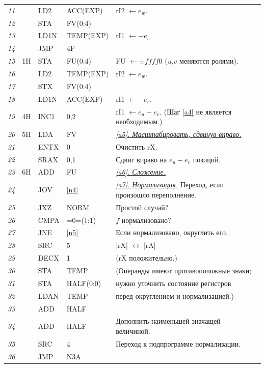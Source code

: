 \begin{longtable}{l l l l l}
\textit{11}	& & LD2 & ACC(EXP) & rI2 $\leftarrow e_w$.\\
\textit{12}	& & STA & FV(0:4) &\\	
\textit{13}	& & LD1N & TEMP(EXP) & rI1 $\leftarrow -e_v$\\
\textit{14}	& & JMP & 4F &\\	
\textit{15} & 1H & STA & FU(0:4) & FU $\leftarrow \pm f f f f 0$ ($u$,$v$ меняются ролями).\\
\textit{16} & & LD2 & TEMP(EXP) & rI2 $\leftarrow e_w$.\\
\textit{17} & & STX & FV(0:4) &\\	
\textit{18}	& & LD1N & ACC(EXP) & rI1 $\leftarrow -e_v$.\\
\textit{19} & 4H & INC1 & 0,2 & rI1 $\leftarrow e_u - e_v$. (Шаг \ref{a4} не является необходимым.)\\
\textit{20} & 5H & LDA & FV & \underline{\textit{\ref{a5}. Масштабировать, сдвинув вправо.}}\\
\textit{21}	& & ENTX & 0 & Очистить rX.\\
\textit{22} & & SRAX & 0,1 & Сдвиг вправо на $e_u - e_v$ позиций.\\
\textit{23} & 6H & ADD & FU & \underline{\textit{\ref{a6}. Сложение.}}\\
\textit{24}	& & JOV & \ref{n4} & \underline{\textit{\ref{a7}. Нормализация.}} Переход, если произошло переполнение.\\
\textit{25}	& & JXZ & NORM & Простой случай?\\
\textit{26}	& & CMPA & =0=(1:1) & $f$ нормализовано?\\
\textit{27}	& & JNE & \ref{n5} & Если нормализовано, округлить его.\\
\textit{28}	& & SRC & 5 & |rX| $\leftrightarrow$ |rA|\\
\textit{29}	& & DECX & 1 & (rX положительно.)\\
\textit{30}	& & STA & TEMP & (Операнды имеют противоположные знаки;\\
\textit{31}	& & STA & HALF(0:0) & нужно уточнить состояние регистров\\
\textit{32}	& & LDAN & TEMP & перед округлением и нормализацией.)\\
\textit{33}	& & ADD & HALF &\\	
\textit{34}	& & ADD & HALF & Дополнить наименьшей значащей величиной.\\
\textit{35} & & SRC & 4 & Переход к подпрограмме нормализации.\\
\textit{36}	& & JMP & N3A & \\	

\end{longtable}
